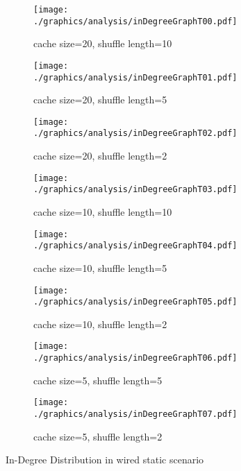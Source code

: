 \begin{figure}
\begin{subfigure}{.5\textwidth}
	\texttt{[image: ./graphics/analysis/inDegreeGraphT00.pdf]}
	\caption{cache size=20, shuffle
	length=10}
	\label{fig:inDegreeDistT00small}
\end{subfigure}%
\begin{subfigure}{.5\textwidth}
	\texttt{[image: ./graphics/analysis/inDegreeGraphT01.pdf]}
	\caption{cache size=20, shuffle
	length=5}
	\label{fig:inDegreeDistT01small}
\end{subfigure}
\begin{subfigure}{.5\textwidth}
	\texttt{[image: ./graphics/analysis/inDegreeGraphT02.pdf]}
	\caption{cache size=20, shuffle
	length=2}
	\label{fig:inDegreeDistT02small}
\end{subfigure}%
\begin{subfigure}{.5\textwidth}
	\texttt{[image: ./graphics/analysis/inDegreeGraphT03.pdf]}
	\caption{cache size=10, shuffle
	length=10}
	\label{fig:inDegreeDistT03small}
\end{subfigure}
\begin{subfigure}{.5\textwidth}
	\texttt{[image: ./graphics/analysis/inDegreeGraphT04.pdf]}
	\caption{cache size=10, shuffle
	length=5}
	\label{fig:inDegreeDistT04small}
\end{subfigure}%
\begin{subfigure}{.5\textwidth}
	\texttt{[image: ./graphics/analysis/inDegreeGraphT05.pdf]}
	\caption{cache size=10, shuffle
	length=2}
	\label{fig:inDegreeDistT05small}
\end{subfigure}
\begin{subfigure}{.5\textwidth}
	\texttt{[image: ./graphics/analysis/inDegreeGraphT06.pdf]}
	\caption{cache size=5, shuffle
	length=5}
	\label{fig:inDegreeDistT06small}
\end{subfigure}%
\begin{subfigure}{.5\textwidth}
	\texttt{[image: ./graphics/analysis/inDegreeGraphT07.pdf]}
	\caption{cache size=5, shuffle
	length=2}
	\label{fig:inDegreeDistT07small}
\end{subfigure}
\caption{In-Degree Distribution in wired static scenario}
\end{figure}

